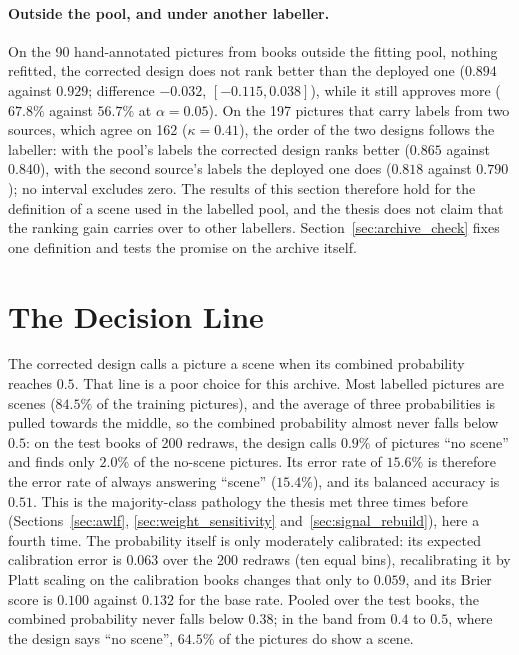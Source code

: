 \paragraph{Outside the pool, and under another labeller.} On the 90 hand-annotated pictures from books outside the fitting pool, nothing refitted, the corrected design does not rank better than the deployed one ($0.894$ against $0.929$; difference $-0.032$, $[-0.115, 0.038]$), while it still approves more ($67.8\%$ against $56.7\%$ at $\alpha=0.05$). On the 197 pictures that carry labels from two sources, which agree on 162 ($\kappa = 0.41$), the order of the two designs follows the labeller: with the pool's labels the corrected design ranks better ($0.865$ against $0.840$), with the second source's labels the deployed one does ($0.818$ against $0.790$); no interval excludes zero. The results of this section therefore hold for the definition of a scene used in the labelled pool, and the thesis does not claim that the ranking gain carries over to other labellers. Section~\ref{sec:archive_check} fixes one definition and tests the promise on the archive itself.

\section{The Decision Line}
\label{sec:decision_line}

The corrected design calls a picture a scene when its combined probability reaches $0.5$. That line is a poor choice for this archive. Most labelled pictures are scenes ($84.5\%$ of the training pictures), and the average of three probabilities is pulled towards the middle, so the combined probability almost never falls below $0.5$: on the test books of 200 redraws, the design calls $0.9\%$ of pictures ``no scene'' and finds only $2.0\%$ of the no-scene pictures. Its error rate of $15.6\%$ is therefore the error rate of always answering ``scene'' ($15.4\%$), and its balanced accuracy is $0.51$. This is the majority-class pathology the thesis met three times before (Sections~\ref{sec:awlf}, \ref{sec:weight_sensitivity} and~\ref{sec:signal_rebuild}), here a fourth time. The probability itself is only moderately calibrated: its expected calibration error is $0.063$ over the 200 redraws (ten equal bins), recalibrating it by Platt scaling on the calibration books changes that only to $0.059$, and its Brier score is $0.100$ against $0.132$ for the base rate. Pooled over the test books, the combined probability never falls below $0.38$; in the band from $0.4$ to $0.5$, where the design says ``no scene'', $64.5\%$ of the pictures do show a scene.

